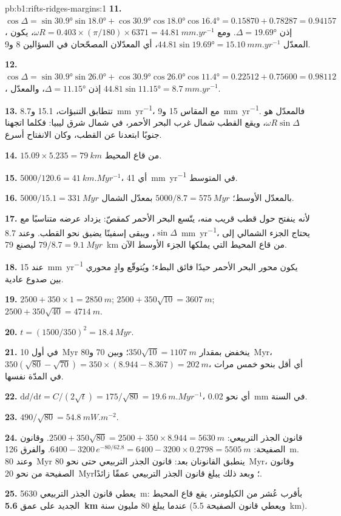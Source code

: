\begin{solution}{pb:b1:rifts-ridges-margins:1}
\textbf{11.} $\cos\Delta = \sin\ang{30.9}\sin\ang{18.0} +
\cos\ang{30.9}\cos\ang{18.0}\cos\ang{16.4} = 0.15870 + 0.78287 = 0.94157$، إذن
$\Delta = \ang{19.69}$. ومع $\omega R = 0.403\times(\pi/180)\times6371 =
\qty{44.81}{mm.yr^{-1}}$، يكون المعدّل $44.81\sin\ang{19.69} =
\qty{15.10}{mm.yr^{-1}}$، أي المعدّلان المصحّحان في السؤالين 8 و9.

\textbf{12.} $\cos\Delta = \sin\ang{30.9}\sin\ang{26.0} +
\cos\ang{30.9}\cos\ang{26.0}\cos\ang{11.4} = 0.22512 + 0.75600 = 0.98112$، إذن
$\Delta = \ang{11.15}$، والمعدّل $44.81\sin\ang{11.15} =
\qty{8.7}{mm.yr^{-1}}$.

\textbf{13.} تتطابق التنبؤات، 15.1 و\qty{8.7}{mm.yr^{-1}}، مع المقاس 15 و\qty{9}{mm.yr^{-1}}. فالمعدّل هو $\omega R\sin\Delta$، ويقع القطب شمال غرب البحر الأحمر، في شمال شرق ليبيا: فكلما اتجهنا جنوبًا ابتعدنا عن القطب، وكان الانفتاح أسرع.

\textbf{14.} $15.09\times5.235 = \qty{79}{km}$ من قاع المحيط.

\textbf{15.} $5000/120.6 = \qty{41}{km.Myr^{-1}}$، أي \qty{41}{mm.yr^{-1}} في المتوسط.

\textbf{16.} $5000/15.1 = \qty{331}{Myr}$ بالمعدّل الأوسط؛
$5000/8.7 = \qty{575}{Myr}$ بمعدّل الشمال.

\textbf{17.} لأنه ينفتح حول قطب قريب منه، يتّسع البحر الأحمر كمقصّ: يزداد عرضه متناسبًا مع $\sin\Delta$، ويبقى إسفينًا يضيق نحو القطب. وعند \qty{8.7}{mm.yr^{-1}}، يحتاج الجزء الشمالي إلى $79/8.7 = \qty{9.1}{Myr}$ ليصنع \qty{79}{km} من قاع المحيط التي يملكها الجزء الأوسط الآن.

\textbf{18.} عند \qty{15}{mm.yr^{-1}} يكون محور البحر الأحمر حيدًا فائق البطء؛ ويُتوقّع وادٍ محوري بين صدوع عادية.

\textbf{19.} $2500 + 350\times1 = \qty{2850}{m}$;
$2500 + 350\sqrt{10} = \qty{3607}{m}$; $2500 + 350\sqrt{40} = \qty{4714}{m}$.

\textbf{20.} $t = (1500/350)^2 = \qty{18.4}{Myr}$.

\textbf{21.} في أول \qty{10}{Myr} ينخفض بمقدار $350\sqrt{10} = \qty{1107}{m}$؛
وبين 70 و\qty{80}{Myr}، $350(\sqrt{80} - \sqrt{70}) = 350\times(8.944 -
8.367) = \qty{202}{m}$، أي أقل بنحو خمس مرات في المدّة نفسها.

\textbf{22.} $\mathrm dd/\mathrm dt = C/(2\sqrt t) = 175/\sqrt{80} =
\qty{19.6}{m.Myr^{-1}}$، أي نحو \qty{0.02}{mm} في السنة.

\textbf{23.} $490/\sqrt{80} = \qty{54.8}{mW.m^{-2}}$.

\textbf{24.} قانون الجذر التربيعي: $2500 + 350\sqrt{80} = 2500 + 350\times8.944 =
\qty{5630}{m}$. وقانون الصفيحة: $6400 - 3200\,e^{-80/62.8} = 6400 - 3200\times0.2798
= \qty{5505}{m}$. والفرق \qty{126}{m}. وعند \qty{80}{Myr} ينطبق القانونان بعد: قانون الجذر التربيعي حتى نحو \qty{80}{Myr}، وقانون الصفيحة من نحو \qty{20}{Myr}؛ وبعد ذلك يبلغ قانون الجذر التربيعي عمقًا زائدًا.

\textbf{25.} يعطي قانون الجذر التربيعي \qty{5630}{m}: بأقرب عُشر من الكيلومتر، يقع قاع المحيط الجديد على عمق \textbf{\qty[text-series-to-math=true]{5.6}{km}} عندما يبلغ 80 مليون سنة (ويعطي قانون الصفيحة \qty{5.5}{km}).
\end{solution}
